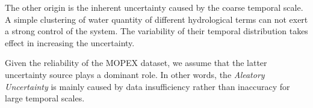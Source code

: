 \documentclass[11pt]{article}
\begin{document}
The other origin is the inherent uncertainty caused by the coarse temporal scale. A simple clustering of water quantity of different hydrological terms can not exert a strong control of the system. The variability of their temporal distribution takes effect in increasing the uncertainty. 

Given the reliability of the MOPEX dataset, we assume that the latter uncertainty source plays a dominant role. In other words, the \emph{Aleatory Uncertainty} is mainly caused by data insufficiency rather than inaccuracy for large temporal scales. 












\iffalse
\end{document}
